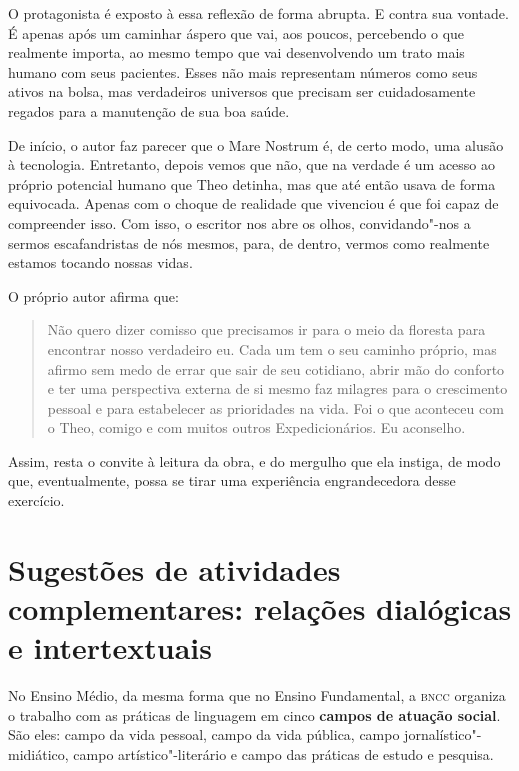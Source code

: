 \documentclass[12pt]{extarticle}
\begin{document}
O protagonista é exposto à essa reflexão de forma abrupta. E contra sua
vontade. É apenas após um caminhar áspero que vai, aos poucos,
percebendo o que realmente importa, ao mesmo tempo que vai desenvolvendo
um trato mais humano com seus pacientes. Esses não mais representam
números como seus ativos na bolsa, mas verdadeiros universos que
precisam ser cuidadosamente regados para a manutenção de sua boa saúde.

De início, o autor faz parecer que o Mare Nostrum é, de certo modo, uma
alusão à tecnologia. Entretanto, depois vemos que não, que na verdade é
um acesso ao próprio potencial humano que Theo detinha, mas que até
então usava de forma equivocada. Apenas com o choque de realidade que
vivenciou é que foi capaz de compreender isso. Com isso, o escritor nos
abre os olhos, convidando"-nos a sermos escafandristas de nós mesmos,
para, de dentro, vermos como realmente estamos tocando nossas vidas.

O próprio autor afirma que:

\begin{quote}
Não quero dizer comisso que precisamos ir para o meio da floresta para
encontrar nosso verdadeiro eu. Cada um tem o seu caminho próprio, mas
afirmo sem medo de errar que sair de seu cotidiano, abrir mão do
conforto e ter uma perspectiva externa de si mesmo faz milagres para o
crescimento pessoal e para estabelecer as prioridades na vida. Foi o que
aconteceu com o Theo, comigo e com muitos outros Expedicionários. Eu
aconselho.
\end{quote}

Assim, resta o convite à leitura da obra, e do mergulho que ela instiga,
de modo que, eventualmente, possa se tirar uma experiência
engrandecedora desse exercício.


\section{Sugestões de atividades complementares: relações dialógicas e
intertextuais}


No Ensino Médio, da mesma forma que no Ensino Fundamental, a \textsc{bncc}
organiza o trabalho com as práticas de linguagem em cinco \textbf{campos
de atuação social}. São eles: campo da vida pessoal, campo da vida
pública, campo jornalístico"-midiático, campo artístico"-literário e campo
das práticas de estudo e pesquisa.
\end{document}
